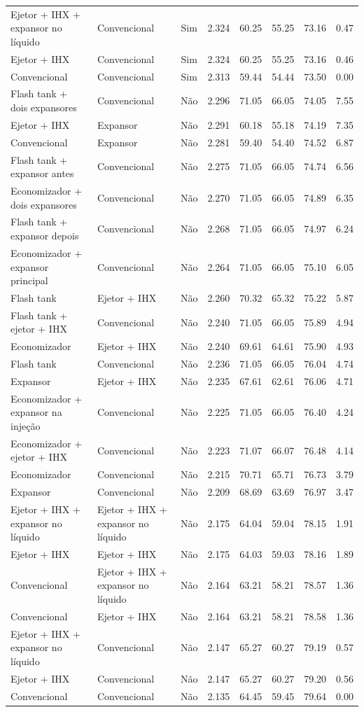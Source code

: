 {\begin{tabular}{llcrrrrr}
Ejetor + IHX + expansor no líquido & Convencional & Sim & 2.324 & 60.25 & 55.25 & 73.16 & 0.47 \\
Ejetor + IHX & Convencional & Sim & 2.324 & 60.25 & 55.25 & 73.16 & 0.46 \\
Convencional & Convencional & Sim & 2.313 & 59.44 & 54.44 & 73.50 & 0.00 \\
Flash tank + dois expansores & Convencional & Não & 2.296 & 71.05 & 66.05 & 74.05 & 7.55 \\
Ejetor + IHX & Expansor & Não & 2.291 & 60.18 & 55.18 & 74.19 & 7.35 \\
Convencional & Expansor & Não & 2.281 & 59.40 & 54.40 & 74.52 & 6.87 \\
Flash tank + expansor antes & Convencional & Não & 2.275 & 71.05 & 66.05 & 74.74 & 6.56 \\
Economizador + dois expansores & Convencional & Não & 2.270 & 71.05 & 66.05 & 74.89 & 6.35 \\
Flash tank + expansor depois & Convencional & Não & 2.268 & 71.05 & 66.05 & 74.97 & 6.24 \\
Economizador + expansor principal & Convencional & Não & 2.264 & 71.05 & 66.05 & 75.10 & 6.05 \\
Flash tank & Ejetor + IHX & Não & 2.260 & 70.32 & 65.32 & 75.22 & 5.87 \\
Flash tank + ejetor + IHX & Convencional & Não & 2.240 & 71.05 & 66.05 & 75.89 & 4.94 \\
Economizador & Ejetor + IHX & Não & 2.240 & 69.61 & 64.61 & 75.90 & 4.93 \\
Flash tank & Convencional & Não & 2.236 & 71.05 & 66.05 & 76.04 & 4.74 \\
Expansor & Ejetor + IHX & Não & 2.235 & 67.61 & 62.61 & 76.06 & 4.71 \\
Economizador + expansor na injeção & Convencional & Não & 2.225 & 71.05 & 66.05 & 76.40 & 4.24 \\
Economizador + ejetor + IHX & Convencional & Não & 2.223 & 71.07 & 66.07 & 76.48 & 4.14 \\
Economizador & Convencional & Não & 2.215 & 70.71 & 65.71 & 76.73 & 3.79 \\
Expansor & Convencional & Não & 2.209 & 68.69 & 63.69 & 76.97 & 3.47 \\
Ejetor + IHX + expansor no líquido & Ejetor + IHX + expansor no líquido & Não & 2.175 & 64.04 & 59.04 & 78.15 & 1.91 \\
Ejetor + IHX & Ejetor + IHX & Não & 2.175 & 64.03 & 59.03 & 78.16 & 1.89 \\
Convencional & Ejetor + IHX + expansor no líquido & Não & 2.164 & 63.21 & 58.21 & 78.57 & 1.36 \\
Convencional & Ejetor + IHX & Não & 2.164 & 63.21 & 58.21 & 78.58 & 1.36 \\
Ejetor + IHX + expansor no líquido & Convencional & Não & 2.147 & 65.27 & 60.27 & 79.19 & 0.57 \\
Ejetor + IHX & Convencional & Não & 2.147 & 65.27 & 60.27 & 79.20 & 0.56 \\
Convencional & Convencional & Não & 2.135 & 64.45 & 59.45 & 79.64 & 0.00 \\
\bottomrule
\end{tabular}
}

